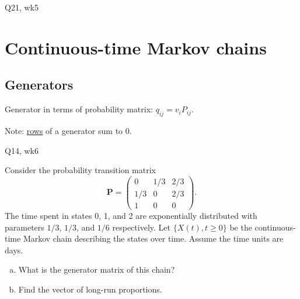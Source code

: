 \begin{problem}{Q21, wk5}{}
\end{problem}

\section{Continuous-time Markov chains}

\subsection{Generators}

Generator in terms of probability matrix: $q_{ij} = v_i P_{ij}$.

Note: \underline{rows} of a generator sum to 0.

\begin{problem}{Q14, wk6}{}


    Consider the probability transition matrix
        $$ \mathbf{P} = 
            \begin{pmatrix}
                0 & 1/3 & 2/3 \\
                1/3 & 0 & 2/3 \\
                1 & 0 & 0
            \end{pmatrix} .
        $$
    The time spent in states 0, 1, and 2 are exponentially distributed with parameters $1/3$, $1/3$, and $1/6$ respectively. Let $\{X(t), t \geq 0\}$ be the continuous-time Markov chain describing the states over time. Assume the time units are days.
        \begin{enumerate}[a)]
            \item What is the generator matrix of this chain?
            \item Find the vector of long-run proportions.
        \end{enumerate}
    
    \tcblower


\end{problem}

